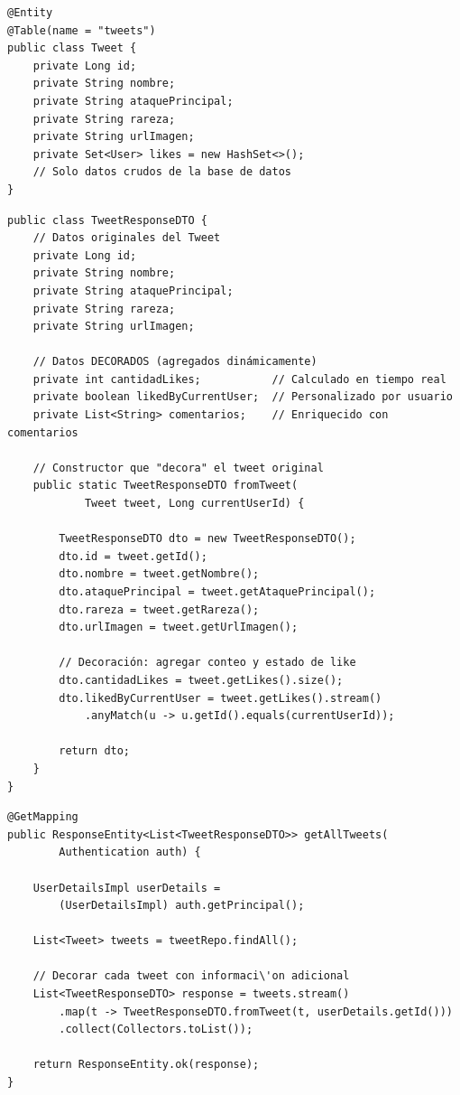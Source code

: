 \documentclass[12pt,a4paper]{article}
\begin{document}
\begin{lstlisting}[caption={Tweet.java -- Entidad base (sin decorar)}]
@Entity
@Table(name = "tweets")
public class Tweet {
    private Long id;
    private String nombre;
    private String ataquePrincipal;
    private String rareza;
    private String urlImagen;
    private Set<User> likes = new HashSet<>();
    // Solo datos crudos de la base de datos
}
\end{lstlisting}

\begin{lstlisting}[caption={TweetResponseDTO.java -- Decorator: Tweet enriquecido}]
public class TweetResponseDTO {
    // Datos originales del Tweet
    private Long id;
    private String nombre;
    private String ataquePrincipal;
    private String rareza;
    private String urlImagen;

    // Datos DECORADOS (agregados dinámicamente)
    private int cantidadLikes;           // Calculado en tiempo real
    private boolean likedByCurrentUser;  // Personalizado por usuario
    private List<String> comentarios;    // Enriquecido con comentarios

    // Constructor que "decora" el tweet original
    public static TweetResponseDTO fromTweet(
            Tweet tweet, Long currentUserId) {

        TweetResponseDTO dto = new TweetResponseDTO();
        dto.id = tweet.getId();
        dto.nombre = tweet.getNombre();
        dto.ataquePrincipal = tweet.getAtaquePrincipal();
        dto.rareza = tweet.getRareza();
        dto.urlImagen = tweet.getUrlImagen();

        // Decoración: agregar conteo y estado de like
        dto.cantidadLikes = tweet.getLikes().size();
        dto.likedByCurrentUser = tweet.getLikes().stream()
            .anyMatch(u -> u.getId().equals(currentUserId));

        return dto;
    }
}
\end{lstlisting}

\begin{lstlisting}[caption={TweetController.java -- Aplica la decoraci\'on al recuperar brawlers}]
@GetMapping
public ResponseEntity<List<TweetResponseDTO>> getAllTweets(
        Authentication auth) {

    UserDetailsImpl userDetails =
        (UserDetailsImpl) auth.getPrincipal();

    List<Tweet> tweets = tweetRepo.findAll();

    // Decorar cada tweet con informaci\'on adicional
    List<TweetResponseDTO> response = tweets.stream()
        .map(t -> TweetResponseDTO.fromTweet(t, userDetails.getId()))
        .collect(Collectors.toList());

    return ResponseEntity.ok(response);
}
\end{lstlisting}
\end{document}

